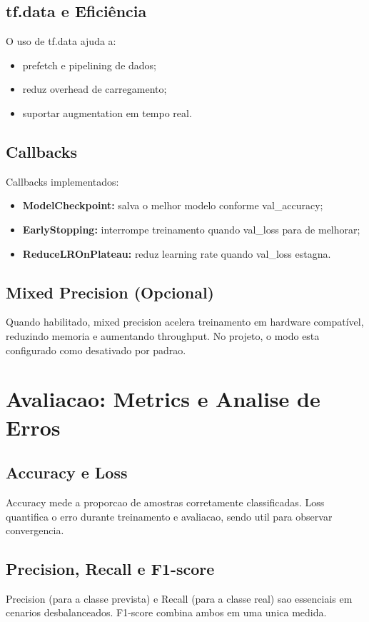 \subsection{tf.data e Eficiência}
O uso de tf.data ajuda a:
\begin{itemize}
  \item prefetch e pipelining de dados;
  \item reduz overhead de carregamento;
  \item suportar augmentation em tempo real.
\end{itemize}

\subsection{Callbacks}
Callbacks implementados:
\begin{itemize}
  \item \textbf{ModelCheckpoint:} salva o melhor modelo conforme val\_accuracy;
  \item \textbf{EarlyStopping:} interrompe treinamento quando val\_loss para de melhorar;
  \item \textbf{ReduceLROnPlateau:} reduz learning rate quando val\_loss estagna.
\end{itemize}

\subsection{Mixed Precision (Opcional)}
Quando habilitado, mixed precision acelera treinamento em hardware compatível, reduzindo memoria e aumentando throughput. No projeto, o modo esta configurado como desativado por padrao.

\section{Avaliacao: Metrics e Analise de Erros}

\subsection{Accuracy e Loss}
Accuracy mede a proporcao de amostras corretamente classificadas. Loss quantifica o erro durante treinamento e avaliacao, sendo util para observar convergencia.

\subsection{Precision, Recall e F1-score}
Precision (para a classe prevista) e Recall (para a classe real) sao essenciais em cenarios desbalanceados. F1-score combina ambos em uma unica medida.


